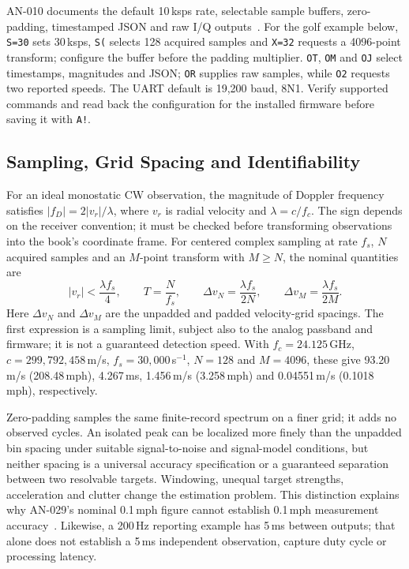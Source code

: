 AN-010 documents the default 10\,ksps rate, selectable sample buffers, zero-padding, timestamped JSON and raw I/Q outputs~\cite{an010}.
For the golf example below, \texttt{S=30} sets 30\,ksps, \texttt{S(} selects 128 acquired samples and \texttt{X=32} requests a 4096-point transform; configure the buffer before the padding multiplier.
\texttt{OT}, \texttt{OM} and \texttt{OJ} select timestamps, magnitudes and JSON; \texttt{OR} supplies raw samples, while \texttt{O2} requests two reported speeds.
The UART default is 19,200 baud, 8N1.
Verify supported commands and read back the configuration for the installed firmware before saving it with \texttt{A!}.

\subsection{Sampling, Grid Spacing and Identifiability}
For an ideal monostatic CW observation, the magnitude of Doppler frequency satisfies $|f_D|=2|v_r|/\lambda$, where $v_r$ is radial velocity and $\lambda=c/f_c$.
The sign depends on the receiver convention; it must be checked before transforming observations into the book's coordinate frame.
For centered complex sampling at rate $f_s$, $N$ acquired samples and an $M$-point transform with $M\ge N$, the nominal quantities are
\begin{equation}
\label{eq:hardwaredopplergrid}
 |v_r|<\frac{\lambda f_s}{4},\qquad
 T=\frac{N}{f_s},\qquad
 \Delta v_N=\frac{\lambda f_s}{2N},\qquad
 \Delta v_M=\frac{\lambda f_s}{2M}.
\end{equation}
Here $\Delta v_N$ and $\Delta v_M$ are the unpadded and padded velocity-grid spacings.
The first expression is a sampling limit, subject also to the analog passband and firmware; it is not a guaranteed detection speed.
With $f_c=24.125$\,GHz, $c=299{,}792{,}458$\,m/s, $f_s=30{,}000$\,s$^{-1}$, $N=128$ and $M=4096$, these give 93.20\,m/s (208.48\,mph), 4.267\,ms, 1.456\,m/s (3.258\,mph) and 0.04551\,m/s (0.1018\,mph), respectively.

Zero-padding samples the same finite-record spectrum on a finer grid; it adds no observed cycles.
An isolated peak can be localized more finely than the unpadded bin spacing under suitable signal-to-noise and signal-model conditions, but neither spacing is a universal accuracy specification or a guaranteed separation between two resolvable targets.
Windowing, unequal target strengths, acceleration and clutter change the estimation problem.
This distinction explains why AN-029's nominal 0.1\,mph figure cannot establish 0.1\,mph measurement accuracy~\cite{an029}.
Likewise, a 200\,Hz reporting example has 5\,ms between outputs; that alone does not establish a 5\,ms independent observation, capture duty cycle or processing latency.

